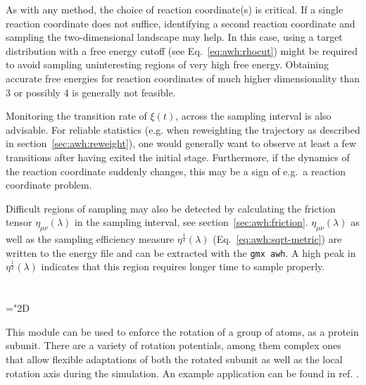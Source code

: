 As with any method, the choice of reaction coordinate(s) is critical. 
If a single reaction coordinate does not suffice,  identifying a second reaction coordinate and sampling the two-dimensional landscape may help.
In this case, using a target distribution with a free energy cutoff (see Eq.~\ref{eq:awh:rhocut})
 might be required to avoid sampling uninteresting regions of very high free energy.
Obtaining accurate free energies for reaction coordinates of much higher dimensionality than 3 or possibly 4 is generally not feasible.

Monitoring the transition rate of $\xi(t)$, across the sampling interval is also advisable.
For reliable statistics (e.g. when reweighting the trajectory as described in section~\ref{sec:awh:reweight}), 
one would generally want to observe at least a few transitions after having exited the initial stage.
Furthermore, if the dynamics of the reaction coordinate suddenly changes, this may be a sign of e.g.\ a reaction coordinate problem.

Difficult regions of sampling may also be detected by calculating the friction tensor $\eta_{\mu\nu}(\lambda)$ in the sampling interval,
see section~\ref{sec:awh:friction}.
$\eta_{\mu\nu}(\lambda)$ as well as the sampling efficiency measure 
$\eta^{\frac{1}{2}}(\lambda)$ (Eq.~\ref{eq:awh:sqrt-metric}) are written to the energy file 
and can be extracted with  the {\tt gmx awh}.
A high peak in $\eta^{\frac{1}{2}}(\lambda)$ indicates that this region requires longer time to sample properly.

\section{}
\label{sec:rotation}

\mathchardef\mhyphen="2D
\newcommand{\rotiso     }{^\mathrm{iso}}
\newcommand{\rotisopf   }{^\mathrm{iso\mhyphen pf}}
\newcommand{\rotpm      }{^\mathrm{pm}}
\newcommand{\rotpmpf    }{^\mathrm{pm\mhyphen pf}}
\newcommand{\rotrm      }{^\mathrm{rm}}
\newcommand{\rotrmpf    }{^\mathrm{rm\mhyphen pf}}
\newcommand{\rotrmtwo   }{^\mathrm{rm2}}
\newcommand{\rotrmtwopf }{^\mathrm{rm2\mhyphen pf}}
\newcommand{\rotflex    }{^\mathrm{flex}}
\newcommand{\rotflext   }{^\mathrm{flex\mhyphen t}}
\newcommand{\rotflextwo }{^\mathrm{flex2}}
\newcommand{\rotflextwot}{^\mathrm{flex2\mhyphen t}}

This module can be used to enforce the rotation of a group of atoms, as {\eg}
a protein subunit. There are a variety of rotation potentials, among them
complex ones that allow flexible adaptations of both the rotated subunit as
well as the local rotation axis during the simulation. An example application 
can be found in ref. \cite{Kutzner2011}.

